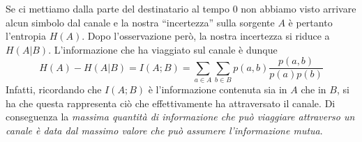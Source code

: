 Se ci mettiamo dalla parte del destinatario al tempo $0$ non abbiamo visto arrivare alcun simbolo dal
canale e la nostra “incertezza” sulla sorgente $A$ è pertanto l’entropia $H(A)$. Dopo l'osservazione però, la nostra incertezza si riduce a $H(A|B)$. L'informazione che ha viaggiato sul canale \`e dunque
\begin{equation}
    H(A) - H(A|B) = I(A;B) = \sum_{a \in A} \sum_{b \in B} p(a,b) \frac{p(a,b)}{p(a)p(b)}
\end{equation}
Infatti, ricordando che $I(A;B)$ è l’informazione contenuta sia in $A$ che in $B$, si ha che questa rappresenta ciò che effettivamente ha attraversato il canale. Di conseguenza la \textit{massima quantità di informazione che può viaggiare attraverso un canale è data dal massimo valore che può assumere l’informazione mutua}.

